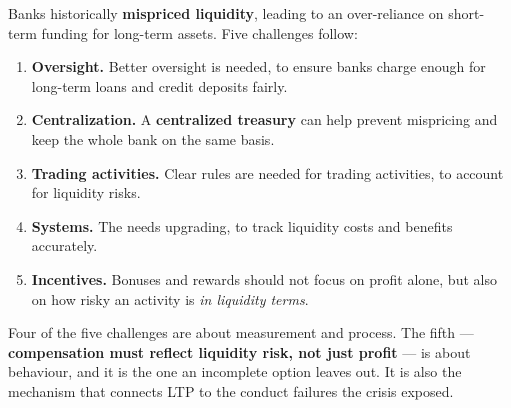 
Banks historically \textbf{mispriced liquidity}, leading to an over-reliance on short-term funding for long-term assets. Five challenges follow:

\begin{enumerate}
\item \textbf{Oversight.} Better oversight is needed, to ensure banks charge enough for long-term loans and credit deposits fairly.
\item \textbf{Centralization.} A \textbf{centralized treasury} can help prevent mispricing and keep the whole bank on the same basis.
\item \textbf{Trading activities.} Clear rules are needed for trading activities, to account for liquidity risks.
\item \textbf{Systems.} The  needs upgrading, to track liquidity costs and benefits accurately.
\item \textbf{Incentives.} Bonuses and rewards should not focus on profit alone, but also on how risky an activity is \emph{in liquidity terms}.
\end{enumerate}

\begin{lrtrapbox}
Four of the five challenges are about measurement and process. The fifth --- \textbf{compensation must reflect liquidity risk, not just profit} --- is about behaviour, and it is the one an incomplete option leaves out. It is also the mechanism that connects LTP to the conduct failures the crisis exposed.
\end{lrtrapbox}


